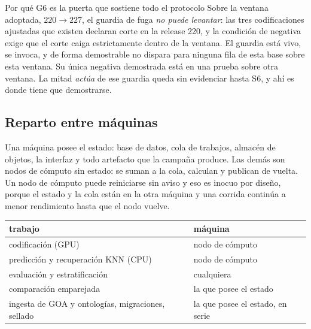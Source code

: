 \begin{aviso}{Por qué G6 es la puerta que sostiene todo el protocolo}
Sobre la ventana adoptada, $220 \rightarrow 227$, el guardia de fuga \emph{no puede
levantar}: las tres codificaciones ajustadas que existen declaran corte en la
release 220, y la condición de negativa exige que el corte caiga estrictamente
dentro de la ventana. El guardia está vivo, se invoca, y de forma demostrable no dispara
para ninguna fila de esta base sobre esta ventana. Su única negativa demostrada está
en una prueba sobre otra ventana. La mitad \emph{actúa} de ese guardia queda sin
evidenciar hasta S6, y ahí es donde tiene que demostrarse.
\end{aviso}

\subsection{Reparto entre máquinas}

Una máquina posee el estado: base de datos, cola de trabajos, almacén de objetos, la
interfaz y todo artefacto que la campaña produce. Las demás son nodos de cómputo sin
estado: se suman a la cola, calculan y publican de vuelta. Un nodo de cómputo puede
reiniciarse sin aviso y eso es inocuo por diseño, porque el estado y la cola están en
la otra máquina y una corrida continúa a menor rendimiento hasta que el nodo vuelve.

\begin{center}
\begin{tabularx}{\linewidth}{@{}X l@{}}
\toprule
trabajo & máquina\\
\midrule
codificación (GPU) & nodo de cómputo\\
predicción y recuperación KNN (CPU) & nodo de cómputo\\
evaluación y estratificación & cualquiera\\
comparación emparejada & la que posee el estado\\
ingesta de GOA y ontologías, migraciones, sellado & la que posee el estado, en serie\\
\bottomrule
\end{tabularx}
\end{center}
